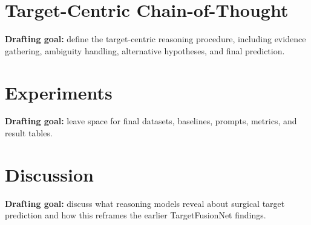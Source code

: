\section{Target-Centric Chain-of-Thought}
\label{sec:target-reasoning-tccot}

\textbf{Drafting goal:} define the target-centric reasoning procedure, including evidence gathering, ambiguity handling, alternative hypotheses, and final prediction.

\section{Experiments}
\label{sec:target-reasoning-experiments}

\textbf{Drafting goal:} leave space for final datasets, baselines, prompts, metrics, and result tables.

\section{Discussion}
\label{sec:target-reasoning-discussion}

\textbf{Drafting goal:} discuss what reasoning models reveal about surgical target prediction and how this reframes the earlier TargetFusionNet findings.
